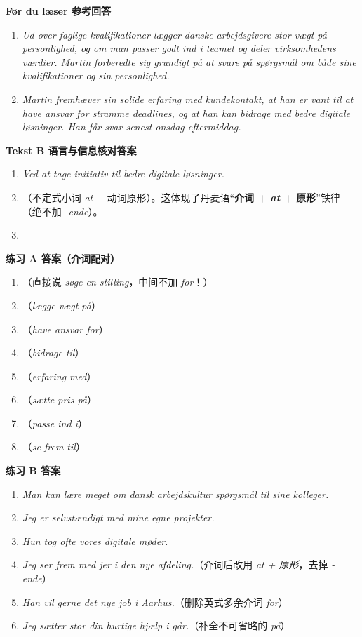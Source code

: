 \begin{answerbox}
\textbf{Før du læser 参考回答}
\begin{enumerate}
  \item \textit{Ud over faglige kvalifikationer lægger danske arbejdsgivere stor vægt på personlighed, og om man passer godt ind i teamet og deler virksomhedens værdier. Martin forberedte sig grundigt på at svare på spørgsmål om både sine kvalifikationer og sin personlighed.}
  \item \textit{Martin fremhæver sin solide erfaring med kundekontakt, at han er vant til at have ansvar for stramme deadlines, og at han kan bidrage med bedre digitale løsninger. Han får svar senest onsdag eftermiddag.}
\end{enumerate}

\textbf{Tekst B 语言与信息核对答案}
\begin{enumerate}
  \item \textit{Ved at tage initiativ til bedre digitale løsninger.}
  \item {}（不定式小词 \textit{at} + 动词原形）。这体现了丹麦语“\textbf{介词 + \textit{at} + 原形}”铁律（绝不加 \textit{-ende}）。
  \item {}
\end{enumerate}

\textbf{练习 A 答案（介词配对）}
\begin{enumerate}
  \item \da{$\times$}（直接说 \textit{søge en stilling}，中间不加 \textit{for}！）
  \item {}（\textit{lægge vægt på}）
  \item {}（\textit{have ansvar for}）
  \item {}（\textit{bidrage til}）
  \item {}（\textit{erfaring med}）
  \item {}（\textit{sætte pris på}）
  \item {}（\textit{passe ind i}）
  \item {}（\textit{se frem til}）
\end{enumerate}

\textbf{练习 B 答案}
\begin{enumerate}
  \item \textit{Man kan lære meget om dansk arbejdskultur  spørgsmål til sine kolleger.}
  \item \textit{Jeg er  selvstændigt med mine egne projekter.}
  \item \textit{Hun tog ofte  vores digitale møder.}
  \item \textit{Jeg ser frem  med jer i den nye afdeling.}（介词后改用 \textit{at + 原形}，去掉 \textit{-ende}）
  \item \textit{Han vil gerne  det nye job i Aarhus.}（删除英式多余介词 \textit{for}）
  \item \textit{Jeg sætter stor  din hurtige hjælp i går.}（补全不可省略的 \textit{på}）
\end{enumerate}


\end{answerbox}
